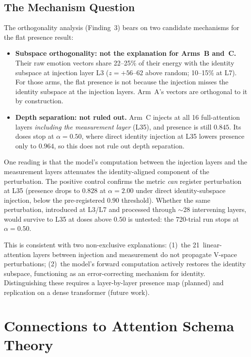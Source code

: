\documentclass[11pt,a4paper]{article}
\begin{document}
\subsection{The Mechanism Question}

The orthogonality analysis (Finding~3) bears on two candidate mechanisms
for the flat presence result:

\begin{itemize}[nosep]
  \item \textbf{Subspace orthogonality: not the explanation for Arms~B
    and~C.} Their raw emotion vectors share
    22--25\% of their energy with the identity subspace at injection
    layer L3 ($z{=}{+}56$--$62$ above random; 10--15\% at L7). For those
    arms, the flat presence is not because the injection misses the
    identity subspace at the injection layers. Arm~A's vectors are
    orthogonal to it by construction.
  \item \textbf{Depth separation: not ruled out.} Arm~C injects at all 16
    full-attention layers \emph{including the measurement layer} (L35),
    and presence is still $0.845$. Its doses stop at $\alpha = 0.50$,
    where direct identity injection at L35 lowers presence only to
    $0.964$, so this does not rule out depth separation.
\end{itemize}

One reading is that the model's computation between the injection layers
and the measurement layers attenuates the identity-aligned component of
the perturbation. The positive control confirms the metric \emph{can}
register perturbation at L35 (presence drops to $0.828$ at
$\alpha = 2.00$ under direct identity-subspace injection, below the
pre-registered $0.90$ threshold).
Whether the same perturbation, introduced at L3/L7 and processed through
$\sim$28 intervening layers, would survive to L35 at doses above $0.50$ is
untested: the 720-trial run stops at $\alpha = 0.50$.

This is consistent with two non-exclusive explanations: (1)~the
21~linear-attention layers between injection and measurement do not
propagate V-space perturbations; (2)~the model's forward computation
actively restores the identity subspace, functioning as an error-correcting
mechanism for identity. Distinguishing these requires a layer-by-layer
presence map (planned) and replication on a dense transformer (future work).

\section{Connections to Attention Schema Theory}
\label{sec:ast}
\end{document}
